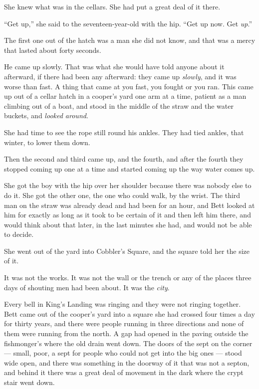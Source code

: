 She knew what was in the cellars. She had put a great deal of it there.

“Get up,” she said to the seventeen-year-old with the hip. “Get up now. Get \textit{up}.”

\sceneBreak

The first one out of the hatch was a man she did not know, and that was a mercy that lasted about forty seconds.

He came up slowly. That was what she would have told anyone about it afterward, if there had been any afterward: they came up \textit{slowly}, and it was worse than fast. A thing that came at you fast, you fought or you ran. This came up out of a cellar hatch in a cooper’s yard one arm at a time, patient as a man climbing out of a boat, and stood in the middle of the straw and the water buckets, and \textit{looked around}.

She had time to see the rope still round his ankles. They had tied ankles, that winter, to lower them down.

Then the second and third came up, and the fourth, and after the fourth they stopped coming up one at a time and started coming up the way water comes up.

She got the boy with the hip over her shoulder because there was nobody else to do it. She got the other one, the one who could walk, by the wrist. The third man on the straw was already dead and had been for an hour, and Bett looked at him for exactly as long as it took to be certain of it and then left him there, and would think about that later, in the last minutes she had, and would not be able to decide.

She went out of the yard into Cobbler’s Square, and the square told her the size of it.

\sceneBreak

It was not the works. It was not the wall or the trench or any of the places three days of shouting men had been about. It was the \textit{city}.

Every bell in King’s Landing was ringing and they were not ringing together. Bett came out of the cooper’s yard into a square she had crossed four times a day for thirty years, and there were people running in three directions and none of them were running from the north. A gap had opened in the paving outside the fishmonger’s where the old drain went down. The doors of the sept on the corner — small, poor, a sept for people who could not get into the big ones — stood wide open, and there was something in the doorway of it that was not a septon, and behind it there was a great deal of movement in the dark where the crypt stair went down.

